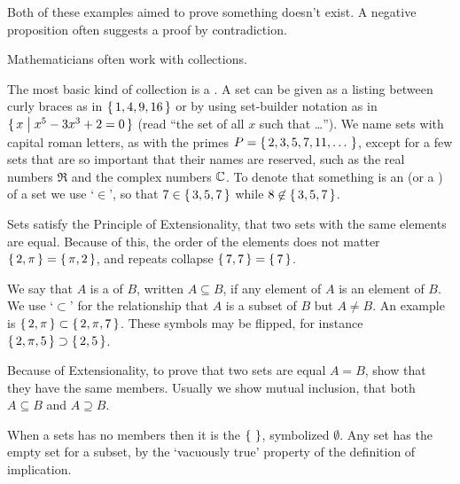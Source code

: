 Both of these examples aimed to prove something doesn't exist.
A negative proposition often suggests a proof by contradiction.















Mathematicians often work with collections. 

The most basic kind of collection is a . 
A set can be given as a listing between curly braces as in
\( \mbox{$\{\, 1,4,9,16 \,\}$} \) or by using set-builder notation as in
\( \mbox{$\{\,x\bigm| x^5-3x^3+2=0 \,\}$} \) (read ``the set of all \( x \)
such that \ldots'').
We name sets with capital roman letters, as with the primes
\( P=\mbox{$\{\,2,3,5,7,11,\ldots\,\,\}$} \), except for a few sets 
that are so important that their names are reserved, such as the
real numbers \( \Re \)
and the complex numbers \( \mathbb{C} \).
To denote that something is an 
(or a ) of a set we
use `\(\in \)',
so that \( 7\in\mbox{$\{\,3,5,7\,\}$} \) while \( 8\not\in\mbox{$\{\,3,5,7\,\}$} \).

Sets satisfy
the Principle of Extensionality, 
that two sets with the same elements are equal.
Because of this, the order of the elements does not matter 
\( \mbox{$\{\,2,\pi\,\}$}=\mbox{$\{\,\pi,2\,\}$} \), 
and
repeats collapse \( \mbox{$\{\,7,7\,\}$}=\mbox{$\{\,7\,\}$} \).

We say that \( A \) is a  of \( B \), written
$A\subseteq B$, if any element of $A$ is an element of $B$.
We use
`\( \subset \)' for the  %
relationship that \( A \) is a subset of \( B \) but \( A\neq B \).
An example is 
\( \mbox{$\{\,2,\pi\,\}$}\subset\mbox{$\{\,2,\pi,7\,\}$} \).
These symbols may be flipped, for instance
\( \mbox{$\{\, 2,\pi,5\,\}$}\supset\mbox{$\{\,2,5\,\}$} \).

Because of Extensionality, to prove that two sets are equal \( A=B \),
show that they have the same members.
Usually we show mutual inclusion,%
that both \( A\subseteq B \) and \( A\supseteq B \).

When a sets has no members then it is
the  \( \mbox{$\{\,\,\}$} \),
symbolized \( \emptyset \).
Any set has the empty set for a subset, by the `vacuously true'
property of the definition of implication.


